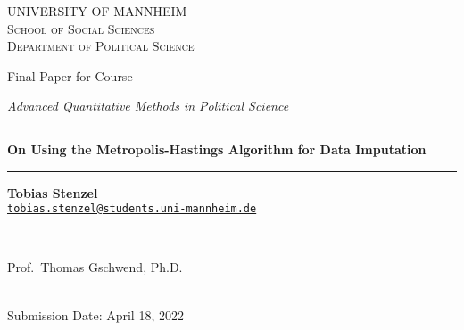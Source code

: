 \documentclass[12pt,english,a4paper,oneside]{article}
\theoremstyle{definition}
\theoremstyle{definition}
\theoremstyle{definition}
\theoremstyle{definition}
\theoremstyle{remark}
\begin{document}
\begin{titlepage}

    \begin{center}
    \large{ \textsc{ \uppercase{University of Mannheim} \\ \vspace{-0.2cm}
School of Social Sciences \\ \vspace{-0.2cm}
Department of Political Science}}

      
        \vspace{3.5cm}
        

       \large{   Final Paper for Course   }


       \large{ \textit{   Advanced Quantitative Methods in Political Science   }}

\renewcommand{\linethickness}{0.03em}
\rule{\linewidth}{\linethickness}


       \LARGE{ \textbf{   On Using the Metropolis-Hastings Algorithm for Data Imputation   }}


       \large{  }

        \vspace{-0.2cm}
\rule{\linewidth}{\linethickness}


\begin{minipage}[t]{0.5\textwidth}
\begin{flushleft}
\singlespacing
 \textbf{Tobias Stenzel}  \\ 


 \href{mailto:tobias.stenzel@students.uni-mannheim.de}{\nolinkurl{tobias.stenzel@students.uni-mannheim.de}}  \\ 

\end{flushleft}
\end{minipage}
\begin{minipage}[t]{0.4\textwidth}
\hfill
\end{minipage}\\
\vspace{0.2cm}
\begin{minipage}[t]{0.35\textwidth}
\hfill
\end{minipage}
\begin{minipage}[t]{0.55\textwidth}
\begin{flushright}
\singlespacing
     Prof.~Thomas Gschwend, Ph.D.  \\       

\end{flushright}
\end{minipage}\\
%


         \vfill
         Submission Date: April 18, 2022 \\ 
        





         \vfill



     \end{center}
    \thispagestyle{empty}
\end{titlepage}
\end{document}
